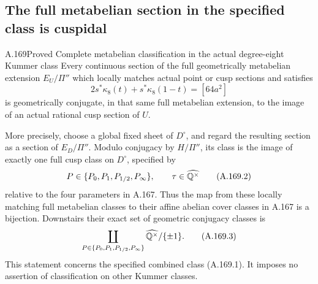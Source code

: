 \subsection{The full metabelian section in the specified class is cuspidal}

\begin{statement}{A.169}{Proved}
{Complete metabelian classification in the actual degree-eight Kummer class}
Every continuous section of the full geometrically metabelian
extension \(E_U/\Pi''\) which locally matches actual point or cusp
sections and satisfies
\[
                 2s^*\kappa_8(t)+s^*\kappa_8(1-t)=[64a^2]
\tag{A.169.1}
\]
is geometrically conjugate, in that same full metabelian extension,
to the image of an actual rational cusp section of \(U\).

More precisely, choose a global fixed sheet of \(D^\circ\), and
regard the resulting section as a section of \(E_D/\Pi''\).
Modulo conjugacy by \(H/\Pi''\), its class is the image of exactly
one full cusp class on \(D^\circ\), specified by
\[
             P\in\{P_0,P_1,P_{1/2},P_\infty\},\qquad
             \tau\in\widehat{\mathbb Q^\times}
\tag{A.169.2}
\]
relative to the four parameters in A.167.  Thus the map from these
locally matching full metabelian classes to their affine abelian
cover classes in A.167 is a bijection.  Downstairs their exact set of
geometric conjugacy classes is
\[
             \coprod_{P\in\{P_0,P_1,P_{1/2},P_\infty\}}
                         \widehat{\mathbb Q^\times}/\{\pm1\}.
\tag{A.169.3}
\]
This statement concerns the specified combined class (A.169.1).
It imposes no assertion of classification on other Kummer classes.
\end{statement}

